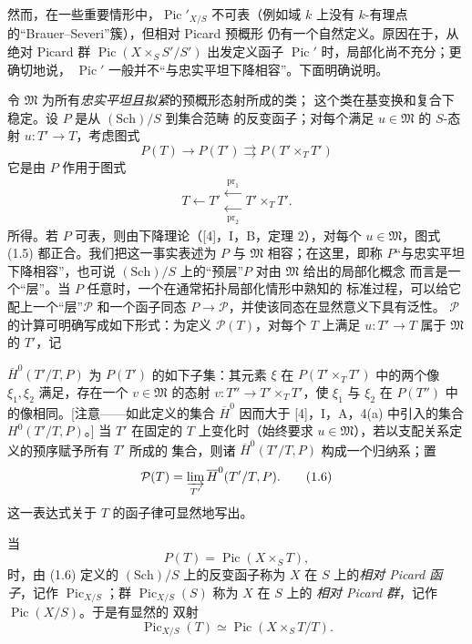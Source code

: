 然而，在一些重要情形中，$\operatorname{Pic}'_{X/S}$ 不可表（例如域
$k$ 上没有 $k$-有理点的“Brauer--Severi”簇），但相对 Picard 预概形
仍有一个自然定义。原因在于，从绝对 Picard 群
$\operatorname{Pic}(X\times_S S'/S')$ 出发定义函子
$\operatorname{Pic}'$ 时，局部化尚不充分；更确切地说，
$\operatorname{Pic}'$ 一般并不“与忠实平坦下降相容”。下面明确说明。

令 $\mathfrak M$ 为所有\emph{忠实平坦且拟紧}的预概形态射所成的类；
这个类在基变换和复合下稳定。设 $P$ 是从 $(\mathrm{Sch})/S$ 到集合范畴
的反变函子；对每个满足 $u\in\mathfrak M$ 的 $S$-态射
$u:T'\longrightarrow T$，考虑图式
\begin{equation}
P(T)\longrightarrow P(T')\rightrightarrows P(T'\times_TT')
\tag{1.5}
\end{equation}
它是由 $P$ 作用于图式
\[
T\longleftarrow T'\mathrel{\substack{\xleftarrow{\,\mathrm{pr}_1\,}\\[-0.35ex]
\xleftarrow[\,\mathrm{pr}_2\,]{}}}T'\times_TT'.
\]
所得。若 $P$ 可表，则由下降理论（[4]，I，B，定理 2），对每个
$u\in\mathfrak M$，图式 (1.5) 都正合。我们把这一事实表述为 $P$ 与
$\mathfrak M$ 相容；在这里，即称 $P$“与忠实平坦下降相容”，也可说
$(\mathrm{Sch})/S$ 上的“预层”$P$ 对由 $\mathfrak M$ 给出的局部化概念
而言是一个“层”。当 $P$ 任意时，一个在通常拓扑局部化情形中熟知的
标准过程，可以给它配上一个“层”$\mathcal P$ 和一个函子同态
$P\longrightarrow\mathcal P$，并使该同态在显然意义下具有泛性。
$\mathcal P$ 的计算可明确写成如下形式：为定义 $\mathcal P(T)$，对每个
$T$ 上满足 $u:T'\longrightarrow T$ 属于 $\mathfrak M$ 的 $T'$，记

$\overline H^0(T'/T,P)$ 为 $P(T')$ 的如下子集：其元素 $\xi$ 在
$P(T'\times_TT')$ 中的两个像 $\xi_1,\xi_2$ 满足，存在一个
$v\in\mathfrak M$ 的态射 $v:T''\longrightarrow T'\times_TT'$，使
$\xi_1$ 与 $\xi_2$ 在 $P(T'')$ 中的像相同。[注意——如此定义的集合
$\overline H^0$ 因而大于 [4]，I，A，4(a) 中引入的集合
$H^0(T'/T,P)$。] 当 $T'$ 在固定的 $T$ 上变化时（始终要求
$u\in\mathfrak M$），若以支配关系定义的预序赋予所有 $T'$ 所成的
集合，则诸 $\overline H^0(T'/T,P)$ 构成一个归纳系；置
\begin{equation}
\mathcal P(T)=\varinjlim_{T'}\overline H^0(T'/T,P).
\tag{1.6}
\end{equation}
这一表达式关于 $T$ 的函子律可显然地写出。

当
\[
P(T)=\operatorname{Pic}(X\times_ST),
\]
时，由 (1.6) 定义的 $(\mathrm{Sch})/S$ 上的反变函子称为 $X$ 在 $S$
上的\emph{相对 Picard 函子}，记作 $\operatorname{Pic}_{X/S}$；群
$\operatorname{Pic}_{X/S}(S)$ 称为 $X$ 在 $S$ 上的
\emph{相对 Picard 群}，记作 $\operatorname{Pic}(X/S)$。于是有显然的
双射
\begin{equation}
\operatorname{Pic}_{X/S}(T)\simeq\operatorname{Pic}(X\times_ST/T).
\tag{1.7}
\end{equation}

